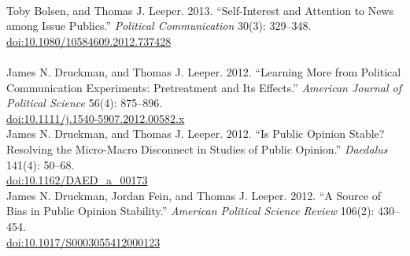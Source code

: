 \documentclass[12pt]{article}
\newcommand{\topic}[1]{\pagebreak[3]\indent {\color{lg}{\footnotesize #1 }}\\}
\newcommand{\entry}[1]{\indent {\color{lg}\guillemotright}\hspace{2pt}#1\vspace{.25em}\\}
\begin{document}
\topic{Peer-Reviewed Publications: 2013}
	\entry{Toby Bolsen, and Thomas J. Leeper. 2013. ``Self-Interest and Attention to News among Issue Publics.'' \textit{Political Communication} 30(3): 329--348.\\ \href{http://doi.org/10.1080/10584609.2012.737428}{doi:10.1080/10584609.2012.737428}}

\topic{Peer-Reviewed Publications: 2012}
	\entry{James N. Druckman, and Thomas J. Leeper. 2012. ``Learning More from Political Communication Experiments: Pretreatment and Its Effects.'' \textit{American Journal of Political Science} 56(4): 875--896.\\ \href{http://doi.org/10.1111/j.1540-5907.2012.00582.x}{doi:10.1111/j.1540-5907.2012.00582.x}}
	\entry{James N. Druckman, and Thomas J. Leeper. 2012. ``Is Public Opinion Stable? Resolving the Micro-Macro Disconnect in Studies of Public Opinion.'' \textit{Daedalus} 141(4): 50--68.\\ \href{http://doi.org/10.1162/DAED\_a\_00173}{doi:10.1162/DAED\_a\_00173}}
	\entry{James N. Druckman, Jordan Fein, and Thomas J. Leeper. 2012. ``A Source of Bias in Public Opinion Stability.'' \textit{American Political Science Review} 106(2): 430--454.\\ \href{http://doi.org/10.1017/S0003055412000123}{doi:10.1017/S0003055412000123}}
\end{document}
